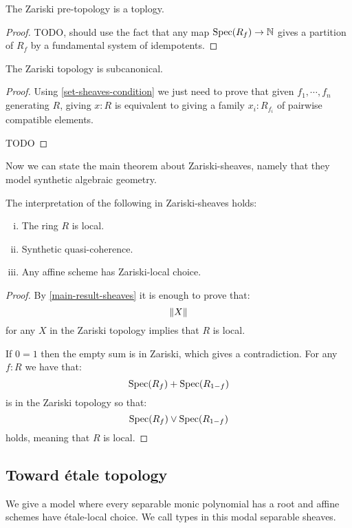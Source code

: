 \begin{lemma}
The Zariski pre-topology is a toplogy.
\end{lemma}

\begin{proof}
TODO, should use the fact that any map $\operatorname{Spec}(R_f)\to\mathbb{N}$ gives a partition of $R_f$ by a fundamental system of idempotents.
\end{proof}

\begin{lemma}\label{zariski-subcanonical}
The Zariski topology is subcanonical.
\end{lemma}

\begin{proof}
Using \cref{set-sheaves-condition} we just need to prove that given $f_1,\cdots,f_n$ generating $R$, giving $x:R$ is equivalent to giving a family $x_i:R_{f_i}$ of pairwise compatible elements. 

TODO
\end{proof}

Now we can state the main theorem about Zariski-sheaves, namely that they model synthetic algebraic geometry.

\begin{theorem}
The interpretation of the following in Zariski-sheaves holds:
\begin{enumerate}[(i)]
\item The ring $R$ is local.
\item Synthetic quasi-coherence.
\item Any affine scheme has Zariski-local choice.
\end{enumerate}
\end{theorem}

\begin{proof}
By \cref{main-result-sheaves} it is enough to prove that:
\[\lVert X \rVert\]
for any $X$ in the Zariski topology implies that $R$ is local. 

If $0=1$ then the empty sum is in Zariski, which gives a contradiction. For any $f:R$ we have that:
\[\operatorname{Spec}(R_f)+\operatorname{Spec}(R_{1-f})\]
is in the Zariski topology so that:
\[\operatorname{Spec}(R_f) \lor \operatorname{Spec}(R_{1-f})\]
holds, meaning that $R$ is local.
\end{proof}

\subsection{Toward étale topology}

We give a model where every separable monic polynomial has a root and affine schemes have étale-local choice. We call types in this modal separable sheaves.

